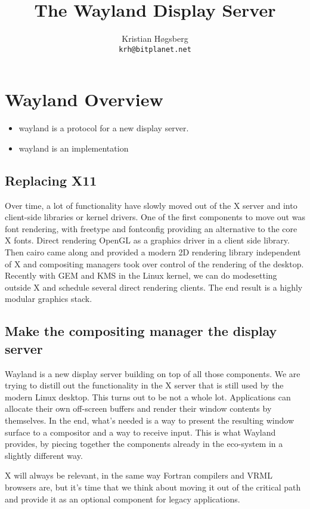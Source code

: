 \documentclass{article}
\author{Kristian Høgsberg\\
\texttt{krh@bitplanet.net}
}
\title{The Wayland Display Server}
\begin{document}
\maketitle

\section{Wayland Overview}

\begin{itemize}
\item wayland is a protocol for a new display server.  
\item wayland is an implementation
\end{itemize}

\subsection{Replacing X11}

Over time, a lot of functionality have slowly moved out of the X
server and into client-side libraries or kernel drivers. One of the
first components to move out was font rendering, with freetype and
fontconfig providing an alternative to the core X fonts.  Direct
rendering OpenGL as a graphics driver in a client side library. Then
cairo came along and provided a modern 2D rendering library
independent of X and compositing managers took over control of the
rendering of the desktop. Recently with GEM and KMS in the Linux
kernel, we can do modesetting outside X and schedule several direct
rendering clients. The end result is a highly modular graphics stack.

\subsection{Make the compositing manager the display server}

Wayland is a new display server building on top of all those
components. We are trying to distill out the functionality in the X
server that is still used by the modern Linux desktop. This turns out
to be not a whole lot. Applications can allocate their own off-screen
buffers and render their window contents by themselves. In the end,
what’s needed is a way to present the resulting window surface to a
compositor and a way to receive input. This is what Wayland provides,
by piecing together the components already in the eco-system in a
slightly different way.

X will always be relevant, in the same way Fortran compilers and VRML
browsers are, but it’s time that we think about moving it out of the
critical path and provide it as an optional component for legacy
applications.
\end{document}
